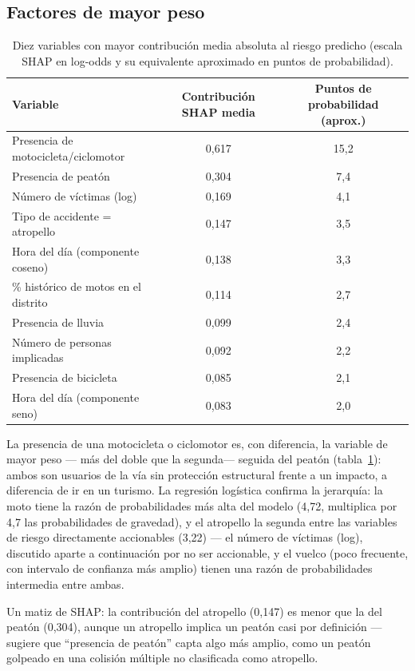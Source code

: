 \documentclass[11pt,a4paper]{article}
\begin{document}
\subsection{Factores de mayor peso}

\begin{table}[h]
\centering
\small
\begin{tabular}{lcc}
\toprule
\textbf{Variable} & \textbf{Contribución SHAP media} & \textbf{Puntos de probabilidad (aprox.)} \\
\midrule
Presencia de motocicleta/ciclomotor & 0,617 & 15,2 \\
Presencia de peatón & 0,304 & 7,4 \\
Número de víctimas (log) & 0,169 & 4,1 \\
Tipo de accidente = atropello & 0,147 & 3,5 \\
Hora del día (componente coseno) & 0,138 & 3,3 \\
\% histórico de motos en el distrito & 0,114 & 2,7 \\
Presencia de lluvia & 0,099 & 2,4 \\
Número de personas implicadas & 0,092 & 2,2 \\
Presencia de bicicleta & 0,085 & 2,1 \\
Hora del día (componente seno) & 0,083 & 2,0 \\
\bottomrule
\end{tabular}
\caption{Diez variables con mayor contribución media absoluta al riesgo predicho (escala SHAP en log-odds y su equivalente aproximado en puntos de probabilidad).}
\label{tab:shap}
\end{table}

La presencia de una motocicleta o ciclomotor es, con diferencia, la variable de mayor peso --- más del doble que la segunda--- seguida del peatón (tabla~\ref{tab:shap}): ambos son usuarios de la vía sin protección estructural frente a un impacto, a diferencia de ir en un turismo. La regresión logística confirma la jerarquía: la moto tiene la razón de probabilidades más alta del modelo (4,72, multiplica por 4,7 las probabilidades de gravedad), y el atropello la segunda entre las variables de riesgo directamente accionables (3,22) --- el número de víctimas (log), discutido aparte a continuación por no ser accionable, y el vuelco (poco frecuente, con intervalo de confianza más amplio) tienen una razón de probabilidades intermedia entre ambas.

Un matiz de SHAP: la contribución del atropello (0,147) es menor que la del peatón (0,304), aunque un atropello implica un peatón casi por definición --- sugiere que ``presencia de peatón'' capta algo más amplio, como un peatón golpeado en una colisión múltiple no clasificada como atropello.
\end{document}
